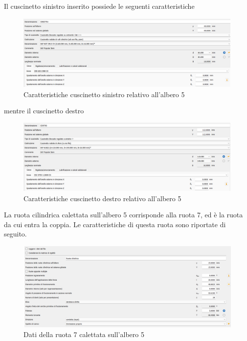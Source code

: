 Il cuscinetto sinistro inserito possiede le seguenti caratteristiche
\begin{figure}[h]
    \centering
    \includegraphics[scale=0.55]{Immagini/CuscinettoSinistraAlbero5.png}
    \caption{Caratteristiche cuscinetto sinistro relativo all'albero 5}
    \label{fig:CuscinettoSinsitraAlbero5}
\end{figure}

mentre il cuscinetto destro
\begin{figure}[h]
    \centering
    \includegraphics[scale=0.55]{Immagini/CuscinettoDestraAlbero5.png}
        \caption{Caratteristiche cuscinetto destro relativo all'albero 5}
    \label{fig:CuscinettoDestraAlbero5}
\end{figure}
\newpage
La ruota cilindrica calettata sull'albero 5 corrisponde alla ruota 7, ed è la ruota da cui entra la coppia. Le caratteristiche di questa ruota sono riportate di seguito.
\begin{figure}[h]
    \centering
    \includegraphics[scale=0.6]{Immagini/Ruota7Albero5.png}
    \caption{Dati della ruota 7 calettata sull'albero 5}
    \label{fig:Ruota5Albero4}
\end{figure}

